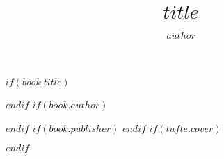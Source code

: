

$if(book.title)$
\title{$title$} 
$endif$
$if(book.author)$
\author{$author$} 
$endif$
$if(book.publisher)$
$endif$
\setcounter{tocdepth}{$if(toc-depth)$$toc-depth$$else$2$endif$} %
$if(tufte.cover)$
 
$endif$





